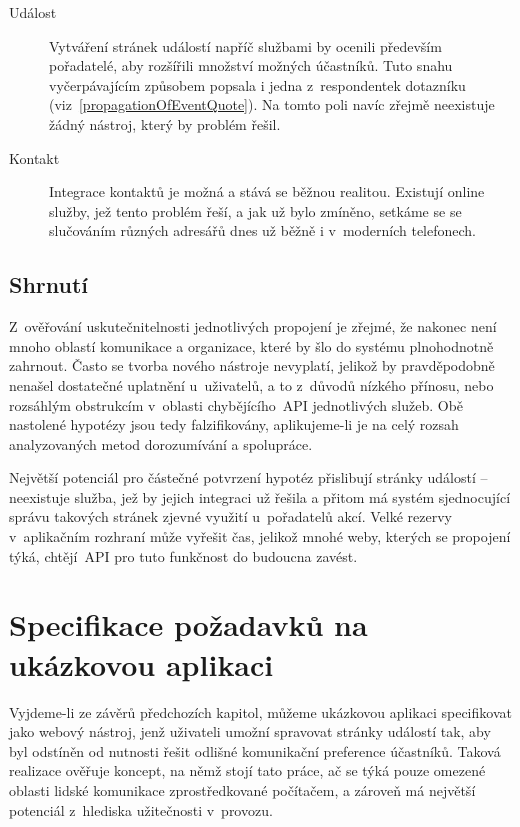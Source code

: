 \documentclass[12pt,oneside,final]{fithesis2}
\begin{document}
\begin{description}
    \item[Událost]
        Vytváření stránek událostí napříč službami by ocenili především pořadatelé, aby rozšířili množství možných účastníků. Tuto snahu vyčerpávajícím způsobem popsala i jedna z~respondentek dotazníku (viz~\ref{propagationOfEventQuote}). Na tomto poli navíc zřejmě neexistuje žádný nástroj, který by problém řešil.

    \item[Kontakt]
        Integrace kontaktů je možná a stává se běžnou realitou. Existují online služby, jež tento problém řeší, a jak už bylo zmíněno, setkáme se se slučováním různých adresářů dnes už běžně i v~moderních telefonech.
\end{description}

\section{Shrnutí}
Z~ověřování uskutečnitelnosti jednotlivých propojení je zřejmé, že nakonec není mnoho oblastí komunikace a organizace, které by šlo do systému plnohodnotně zahrnout. Často se tvorba nového nástroje nevyplatí, jelikož by pravděpodobně nenašel dostatečné uplatnění u~uživatelů, a to z~důvodů nízkého přínosu, nebo rozsáhlým obstrukcím v~oblasti chybějícího~API jednotlivých služeb. Obě nastolené hypotézy jsou tedy falzifikovány, aplikujeme-li je na celý rozsah analyzovaných metod dorozumívání a spolupráce.

Největší potenciál pro částečné potvrzení hypotéz přislibují stránky událostí -- neexistuje služba, jež by jejich integraci už řešila a přitom má systém sjednocující správu takových stránek zjevné využití u~pořadatelů akcí. Velké rezervy v~aplikačním rozhraní může vyřešit čas, jelikož mnohé weby, kterých se propojení týká, chtějí~API pro tuto funkčnost do budoucna zavést.


\chapter{Specifikace požadavků na ukázkovou aplikaci}
Vyjdeme-li ze závěrů předchozích kapitol, můžeme ukázkovou aplikaci specifikovat jako webový nástroj, jenž uživateli umožní spravovat stránky událostí tak, aby byl odstíněn od nutnosti řešit odlišné komunikační preference účastníků. Taková realizace ověřuje koncept, na němž stojí tato práce, ač se týká pouze omezené oblasti lidské komunikace zprostředkované počítačem, a zároveň má největší potenciál z~hlediska užitečnosti v~provozu.
\end{document}
